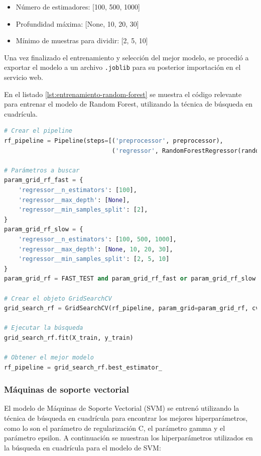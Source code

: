 \begin{itemize}
    \item Número de estimadores: [100, 500, 1000]
    \item Profundidad máxima: [None, 10, 20, 30]
    \item Mínimo de muestras para dividir: [2, 5, 10]
\end{itemize}

Una vez finalizado el entrenamiento y selección del mejor modelo, se procedió
a exportar el modelo a un archivo \texttt{.joblib} para su posterior importación en el
servicio web.

En el listado \ref{lst:entrenamiento-random-forest} se muestra el código relevante
para entrenar el modelo de Random Forest, utilizando la técnica de búsqueda en cuadrícula.

\begin{lstlisting}[language=python, caption={Entrenamiento de Random Forest}, label={lst:entrenamiento-random-forest}]
# Crear el pipeline
rf_pipeline = Pipeline(steps=[('preprocessor', preprocessor),
                              ('regressor', RandomForestRegressor(random_state=42, oob_score=True, n_jobs=-1))])

# Parámetros a buscar
param_grid_rf_fast = {
    'regressor__n_estimators': [100],
    'regressor__max_depth': [None],
    'regressor__min_samples_split': [2],
}
param_grid_rf_slow = {
    'regressor__n_estimators': [100, 500, 1000],
    'regressor__max_depth': [None, 10, 20, 30],
    'regressor__min_samples_split': [2, 5, 10]
}
param_grid_rf = FAST_TEST and param_grid_rf_fast or param_grid_rf_slow

# Crear el objeto GridSearchCV
grid_search_rf = GridSearchCV(rf_pipeline, param_grid=param_grid_rf, cv=5, verbose=2, n_jobs=-1)

# Ejecutar la búsqueda
grid_search_rf.fit(X_train, y_train)

# Obtener el mejor modelo
rf_pipeline = grid_search_rf.best_estimator_
\end{lstlisting}

\subsubsection{Máquinas de soporte vectorial}
El modelo de Máquinas de Soporte Vectorial (SVM) se entrenó utilizando la técnica
de búsqueda en cuadrícula para encontrar los mejores hiperparámetros, como lo son
el parámetro de regularización C, el parámetro gamma y el parámetro epsilon. A continuación
se muestran los hiperparámetros utilizados en la búsqueda en cuadrícula para el modelo
de SVM:


